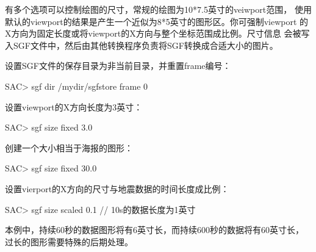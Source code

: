 有多个选项可以控制绘图的尺寸，常规的绘图为10*7.5英寸的veiwport范围，
使用默认的viewport的结果是产生一个近似为8*5英寸的图形区。你可强制viewport
的X方向为固定长度或将viewport的X方向与整个坐标范围成比例。尺寸信息
会被写入SGF文件中，然后由其他转换程序负责将SGF转换成合适大小的图片。

设置SGF文件的保存目录为非当前目录，并重置frame编号：
\begin{SACCode}
SAC> sgf dir /mydir/sgfstore frame 0
\end{SACCode}

设置viewport的X方向长度为3英寸：
\begin{SACCode}
SAC> sgf size fixed 3.0
\end{SACCode}

创建一个大小相当于海报的图形：
\begin{SACCode}
SAC> sgf size fixed 30.0
\end{SACCode}

设置vierport的X方向的尺寸与地震数据的时间长度成比例：
\begin{SACCode}
SAC> sgf size scaled 0.1  // 10s的数据长度为1英寸
\end{SACCode}
本例中，持续60秒的数据图形将有6英寸长，而持续600秒的数据将有60英寸长，
过长的图形需要特殊的后期处理。
